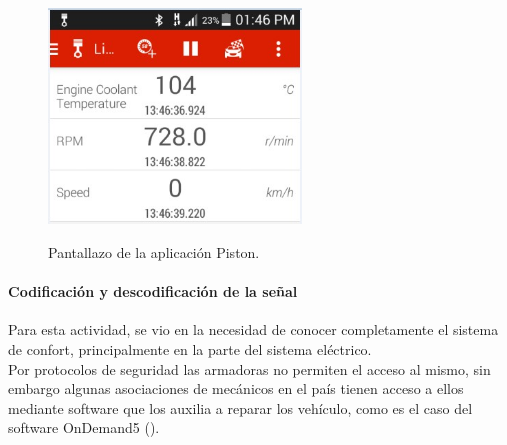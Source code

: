 \begin{figure}[H]
\centering
{\includegraphics[width=0.6\textwidth]{metodologia/piston.jpg}}
\caption{Pantallazo de la aplicación Piston.} \label{Mecinco}
\end{figure}



\paragraph{Codificación y descodificación de la señal}

Para esta actividad, se vio en la necesidad de conocer completamente el sistema de confort, principalmente en la parte del sistema eléctrico. \\

Por protocolos de seguridad las armadoras no permiten el acceso al mismo, sin embargo algunas asociaciones de mecánicos en el país tienen acceso a ellos mediante software que los auxilia a reparar los vehículo, como es el caso del software OnDemand5 (\cite{GB3}).\\
